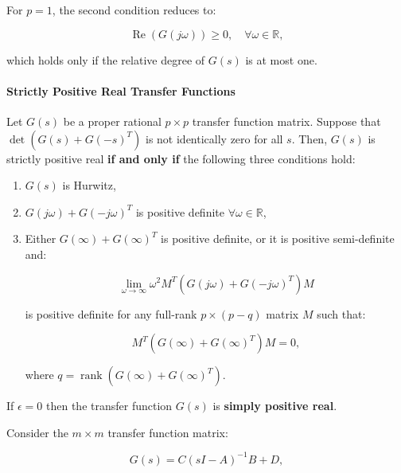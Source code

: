 \newpar{}

For $p = 1$, the second condition reduces to:

\begin{equation*}
    \operatorname{Re}(G(j\omega)) \geq 0, \quad \forall \omega \in \mathbb{R},
\end{equation*}

which holds only if the relative degree of $G(s)$ is at most one.

\paragraph{Strictly Positive Real Transfer Functions}

Let $G(s)$ be a proper rational $p \times p$ transfer function matrix. Suppose that $\det(G(s) + G(-s)^T)$ is not identically zero for all $s$. Then, $G(s)$ is strictly positive real \textbf{if and only if} the following three conditions hold:

\begin{enumerate}
    \item $G(s)$ is Hurwitz,
    \item $G(j\omega) + G(-j\omega)^T$ is positive definite $\forall \omega \in \mathbb{R}$,
    \item Either $G(\infty) + G(\infty)^T$ is positive definite, or it is positive semi-definite and:

          \begin{equation*}
              \lim_{\omega \to \infty} \omega^2 M^T (G(j\omega) + G(-j\omega)^T) M
          \end{equation*}

          is positive definite for any full-rank $p \times (p - q)$ matrix $M$ such that:

          \begin{equation*}
              M^T (G(\infty) + G(\infty)^T) M = 0,
          \end{equation*}

          where $q = \operatorname{rank}(G(\infty) + G(\infty)^T)$.
\end{enumerate}
\newpar{}
If $\epsilon = 0$ then the transfer function $G(s)$ is \textbf{simply positive real}.

\newpar{}

Consider the $m \times m$ transfer function matrix:

\begin{equation*}
    G(s) = C(sI - A)^{-1}B + D,
\end{equation*}

